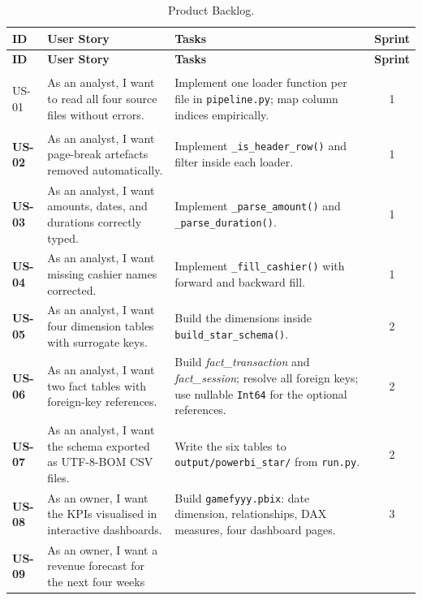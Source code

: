 \documentclass[12pt, a4paper]{report}
\begin{document}
\begin{longtable}{>{\bfseries}p{1.3cm} p{4.6cm} p{6.6cm} c}
  \caption{Product Backlog.\label{tab:backlog}} \\
  \toprule
  \textbf{ID} & \textbf{User Story} & \textbf{Tasks} & \textbf{Sprint} \\
  \midrule
  \endfirsthead
  \toprule
  \textbf{ID} & \textbf{User Story} & \textbf{Tasks} & \textbf{Sprint} \\
  \midrule
  \endhead
  \bottomrule
  \endfoot

  US-01 & As an analyst, I want to read all four source files without
          errors.
        & Implement one loader function per file in
          \texttt{pipeline.py}; map column indices empirically.
        & 1 \\[3pt]
  US-02 & As an analyst, I want page-break artefacts removed
          automatically.
        & Implement \texttt{\_is\_header\_row()} and filter inside each
          loader.
        & 1 \\[3pt]
  US-03 & As an analyst, I want amounts, dates, and durations correctly
          typed.
        & Implement \texttt{\_parse\_amount()} and
          \texttt{\_parse\_duration()}.
        & 1 \\[3pt]
  US-04 & As an analyst, I want missing cashier names corrected.
        & Implement \texttt{\_fill\_cashier()} with forward and backward
          fill.
        & 1 \\[3pt]
  US-05 & As an analyst, I want four dimension tables with surrogate keys.
        & Build the dimensions inside \texttt{build\_star\_schema()}.
        & 2 \\[3pt]
  US-06 & As an analyst, I want two fact tables with foreign-key
          references.
        & Build \textit{fact\_transaction} and \textit{fact\_session};
          resolve all foreign keys; use nullable \texttt{Int64} for the
          optional references.
        & 2 \\[3pt]
  US-07 & As an analyst, I want the schema exported as UTF-8-BOM CSV
          files.
        & Write the six tables to \texttt{output/powerbi\_star/} from
          \texttt{run.py}.
        & 2 \\[3pt]
  US-08 & As an owner, I want the KPIs visualised in interactive
          dashboards.
        & Build \texttt{gamefyyy.pbix}: date dimension, relationships,
          DAX measures, four dashboard pages.
        & 3 \\[3pt]
  US-09 & As an owner, I want a revenue forecast for the next four weeks

\end{longtable}
\end{document}
